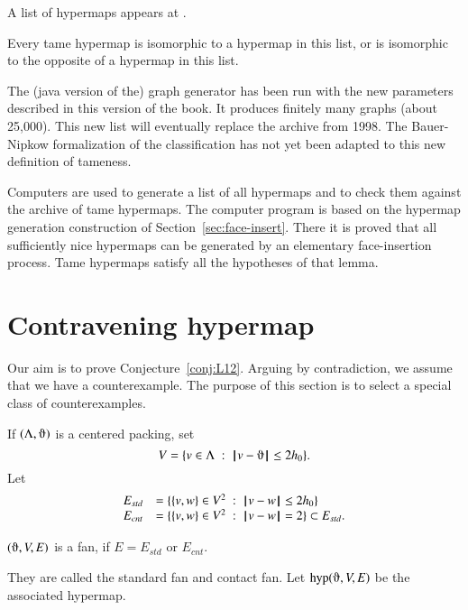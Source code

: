 A list of hypermaps appears at \cite{website:Hales:1998:Code}.

\begin{theorem}
\label{theorem:classification} Every tame hypermap is isomorphic to
a hypermap in this list, or is isomorphic to the opposite of a
hypermap in this list.
\end{theorem}

\begin{note}%
The (java version of the) graph generator has been run with the new parameters described in this version of the book.  It produces finitely many graphs (about 25,000).  This new list will eventually replace the archive from 1998.  The Bauer-Nipkow formalization of the classification has not yet been adapted to this new definition of tameness.
\end{note}


Computers are used to generate a list of all hypermaps and to check
them against the archive of tame hypermaps.  The computer program is
based on the hypermap generation construction of Section~\ref{sec:face-insert}.  There it is
proved that all sufficiently nice hypermaps can be generated by an
elementary face-insertion process.  Tame hypermaps satisfy all the
hypotheses of that lemma.

\section{Contravening hypermap}

Our aim is to prove Conjecture~\ref{conj:L12}.  Arguing by contradiction, we assume that we have a counterexample.  The purpose of this section is to select a special class of counterexamples.

If $(\Lambda,\orgn)$ is a centered packing, set
$$
V = \{v\in \Lambda\mid \norm{v}{\orgn}\le 2\hm\}.
$$
Let
\begin{equation}\label{eqn:fan-edge}
\begin{array}{lll}
 E_{std} &= \{\{v,w\}\in V^2\ :\  {\hskip0.1em|\hskip-0.15em|\hskip0.1em}v - w{\hskip0.1em|\hskip-0.15em|\hskip0.1em}\le 2{h_0} \}\\
 E_{cnt} &= \{\{v,w\}\in V^2\ :\  {\hskip0.1em|\hskip-0.15em|\hskip0.1em}v - w{\hskip0.1em|\hskip-0.15em|\hskip0.1em}= 2 \}\subset E_{std}.
\end{array}
\end{equation}

\begin{lemma}
$(\orgn,V,E)$ is a fan, if $E=E_{std}$ or $E_{cnt}$.
\end{lemma}
They are called the standard fan and contact fan.
Let $\op{hyp}(\orgn,V,E)$ be the associated hypermap.

